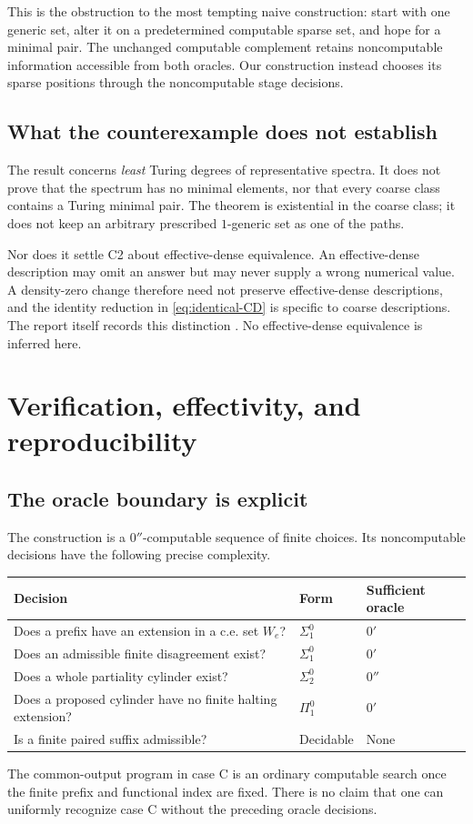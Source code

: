 \documentclass[11pt,a4paper]{article}
\theoremstyle{definition}\newtheorem{definition}[theorem]{Definition}
\theoremstyle{remark}\newtheorem{remark}[theorem]{Remark}
\begin{document}
This is the obstruction to the most tempting naive construction: start with
one generic set, alter it on a predetermined computable sparse set, and hope
for a minimal pair. The unchanged computable complement retains noncomputable
information accessible from both oracles. Our construction instead chooses
its sparse positions through the noncomputable stage decisions.

\subsection{What the counterexample does not establish}
The result concerns \emph{least} Turing degrees of representative spectra.
It does not prove that the spectrum has no minimal elements, nor that every
coarse class contains a Turing minimal pair. The theorem is existential in
the coarse class; it does not keep an arbitrary prescribed $1$-generic set
as one of the paths.

Nor does it settle C2 about effective-dense equivalence. An effective-dense
description may omit an answer but may never supply a wrong numerical value.
A density-zero change therefore need not preserve effective-dense descriptions,
and the identity reduction in \eqref{eq:identical-CD} is specific to coarse
descriptions. The report itself records this distinction
\cite[Section~5, C2]{Input}. No effective-dense equivalence is inferred here.

\section{Verification, effectivity, and reproducibility}
\label{sec:verification}

\subsection{The oracle boundary is explicit}
The construction is a $0''$-computable sequence of finite choices. Its
noncomputable decisions have the following precise complexity.
\begin{center}
\begin{tabularx}{\textwidth}{@{}Xll@{}}
\toprule
Decision & Form & Sufficient oracle\\
\midrule
Does a prefix have an extension in a c.e. set $W_e$?
  & $\Sigma^0_1$ & $0'$\\
Does an admissible finite disagreement exist?
  & $\Sigma^0_1$ & $0'$\\
Does a whole partiality cylinder exist?
  & $\Sigma^0_2$ & $0''$\\
Does a proposed cylinder have no finite halting extension?
  & $\Pi^0_1$ & $0'$\\
Is a finite paired suffix admissible?
  & Decidable & None\\
\bottomrule
\end{tabularx}
\end{center}
The common-output program in case C is an ordinary computable search once
the finite prefix and functional index are fixed. There is no claim that
one can uniformly recognize case C without the preceding oracle decisions.
\end{document}
